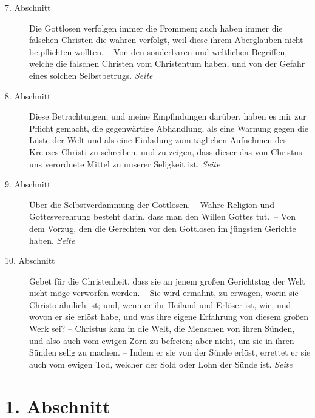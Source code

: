\begin{description}
\item[7. Abschnitt] Die Gottlosen verfolgen immer die Frommen; auch haben immer die falschen Christen die wahren
verfolgt, weil diese ihrem Aberglauben nicht beipflichten wollten. -- Von den
sonderbaren und weltlichen
Begriffen, welche die falschen Christen vom
Christentum haben, und von der Gefahr eines solchen Selbstbetrugs.
\dotfill \textit{Seite~\pageref{kap1_ab7}}\\
\item[8. Abschnitt] Diese Betrachtungen, und meine Empfindungen darüber, haben
es mir zur Pflicht gemacht, die gegenwärtige Abhandlung, als eine Warnung gegen
die Lüste der Welt und als eine Einladung zum täglichen Aufnehmen des Kreuzes
Christi zu schreiben, und zu zeigen, dass dieser das von Christus uns verordnete
Mittel zu unserer Seligkeit ist.
\dotfill \textit{Seite~\pageref{kap1_ab8}}\\
\item[9. Abschnitt] Über die Selbstverdammung der Gottlosen. -- Wahre Religion
und Gottesverehrung  besteht darin, dass man den
Willen Gottes tut.~-- Von dem
Vorzug, den die Gerechten vor den Gottlosen im jüngsten Gerichte haben.
\dotfill \textit{Seite~\pageref{kap1_ab9}}\\
\item[10. Abschnitt] Gebet für die Christenheit, dass sie an jenem großen
Gerichtstag der Welt nicht möge verworfen werden. -- Sie wird ermahnt, zu
erwägen, worin sie Christo ähnlich ist; und, wenn er ihr Heiland und Erlöser
ist, wie, und wovon er sie erlöst habe, und was ihre eigene Erfahrung von diesem
großen Werk sei? -- Christus kam in die Welt, die Menschen von ihren Sünden, und
also auch vom ewigen Zorn zu befreien; aber nicht, um sie in ihren Sünden selig
zu machen. -- Indem er sie von der Sünde erlöst, errettet er sie auch vom ewigen
Tod, welcher der Sold oder Lohn der Sünde ist.
\dotfill \textit{Seite~\pageref{kap1_ab10}}\\
\end{description}

\newpage

\section{1. Abschnitt} \label{kap1_ab1}


